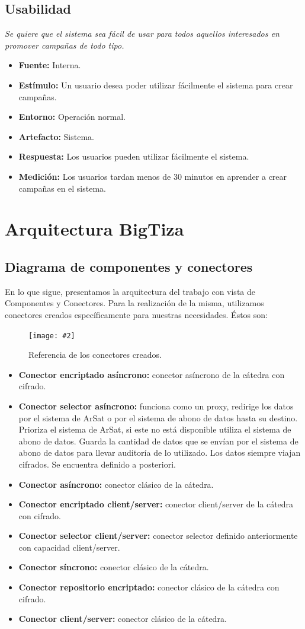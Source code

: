 \documentclass[a4paper, 10pt, twoside]{article}
\newcommand{\diagramadeancho}[2]{
  \begin{center}
    \texttt{[image: \#2]}
  \end{center}
}
\newcommand{\escenario}[7] {
  \textit{{#1}}
  \begin{itemize}
    \item \textbf{Fuente:} {#2}
    \item \textbf{Estímulo:} {#3}
    \item \textbf{Entorno:} {#4}
    \item \textbf{Artefacto:} {#5}
    \item \textbf{Respuesta:} {#6}
    \item \textbf{Medición:} {#7}
  \end{itemize}
}
\begin{document}
\subsection{Usabilidad}

\escenario{Se quiere que el sistema sea fácil de usar para todos aquellos interesados en promover campañas de todo tipo.}
    {Interna.}
    {Un usuario desea poder utilizar fácilmente el sistema para crear campañas.}
    {Operación normal.}
    {Sistema.}
    {Los usuarios pueden utilizar fácilmente el sistema.}
    {Los usuarios tardan menos de 30 minutos en aprender a crear campañas en el sistema.}

\newpage

\section{Arquitectura BigTiza}

\subsection{Diagrama de componentes y conectores}
En lo que sigue, presentamos la arquitectura del trabajo con vista de Componentes y Conectores. Para la realización de la misma, utilizamos conectores creados específicamente para nuestras necesidades. Éstos son:

\begin{figure}[h!]
  \diagramadeancho{12cm}{./diagramas/referenciadeconectores.pdf}
  \caption{Referencia de los conectores creados.}
\end{figure}

\begin{itemize}
  \item \textbf{Conector encriptado asíncrono:} conector asíncrono de la cátedra con cifrado.
  \item \textbf{Conector selector asíncrono:} funciona como un proxy, redirige los datos por el sistema de ArSat o por el sistema de abono de datos hasta su destino. Prioriza el sistema de ArSat, si este no está disponible utiliza el sistema de abono de datos. Guarda la cantidad de datos que se envían por el sistema de abono de datos para llevar auditoría de lo utilizado. Los datos siempre viajan cifrados. Se encuentra definido a posteriori.
  \item \textbf{Conector asíncrono:} conector clásico de la cátedra.
  \item \textbf{Conector encriptado client/server:} conector client/server de la cátedra con cifrado.
  \item \textbf{Conector selector client/server:} conector selector definido anteriormente con capacidad client/server.
  \item \textbf{Conector síncrono:} conector clásico de la cátedra.
  \item \textbf{Conector repositorio encriptado:} conector clásico de la cátedra con cifrado.
  \item \textbf{Conector client/server:} conector clásico de la cátedra.

\end{itemize}
\end{document}
